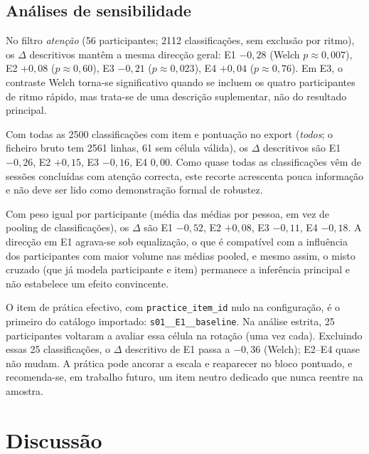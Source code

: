 \subsection{Análises de sensibilidade}
\label{subsec:res_sensibilidade}

No filtro \textit{atenção} (56 participantes; 2112 classificações, sem exclusão por ritmo), os \(\Delta\) descritivos mantêm a mesma direcção geral: E1 \(-0{,}28\) (Welch \(p \approx 0{,}007\)), E2 \(+0{,}08\) (\(p \approx 0{,}60\)), E3 \(-0{,}21\) (\(p \approx 0{,}023\)), E4 \(+0{,}04\) (\(p \approx 0{,}76\)). Em E3, o contraste Welch torna-se significativo quando se incluem os quatro participantes de ritmo rápido, mas trata-se de uma descrição suplementar, não do resultado principal.

Com todas as 2500 classificações com item e pontuação no export (\textit{todos}; o ficheiro bruto tem 2561 linhas, 61 sem célula válida), os \(\Delta\) descritivos são E1 \(-0{,}26\), E2 \(+0{,}15\), E3 \(-0{,}16\), E4 \(0{,}00\). Como quase todas as classificações vêm de sessões concluídas com atenção correcta, este recorte acrescenta pouca informação e não deve ser lido como demonstração formal de robustez.

Com peso igual por participante (média das médias por pessoa, em vez de pooling de classificações), os \(\Delta\) são E1 \(-0{,}52\), E2 \(+0{,}08\), E3 \(-0{,}11\), E4 \(-0{,}18\). A direcção em E1 agrava-se sob equalização, o que é compatível com a influência dos participantes com maior volume nas médias pooled, e mesmo assim, o misto cruzado (que já modela participante e item) permanece a inferência principal e não estabelece um efeito convincente.

O item de prática efectivo, com \texttt{practice\_item\_id} nulo na configuração, é o primeiro do catálogo importado: \texttt{s01\_\_E1\_\_baseline}. Na análise estrita, 25 participantes voltaram a avaliar essa célula na rotação (uma vez cada). Excluindo essas 25 classificações, o \(\Delta\) descritivo de E1 passa a \(-0{,}36\) (Welch); E2--E4 quase não mudam. A prática pode ancorar a escala e reaparecer no bloco pontuado, e recomenda-se, em trabalho futuro, um item neutro dedicado que nunca reentre na amostra.


\section{Discussão}
\label{sec:res_discussao}

